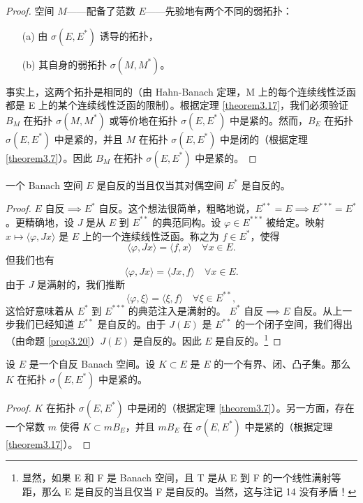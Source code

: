 \begin{proof}
空间 $M$——配备了范数 $E$——先验地有两个不同的弱拓扑：
\begin{itemize}
    \item[(a)] 由 $\sigma(E, E^*)$ 诱导的拓扑，
    \item[(b)] 其自身的弱拓扑 $\sigma(M, M^*)$。
\end{itemize}
事实上，这两个拓扑是相同的（由 Hahn-Banach 定理，M 上的每个连续线性泛函都是 E 上的某个连续线性泛函的限制）。根据定理 \ref{theorem3.17}，我们必须验证 $B_M$ 在拓扑 $\sigma(M, M^*)$ 或等价地在拓扑 $\sigma(E, E^*)$ 中是紧的。然而，$B_E$ 在拓扑 $\sigma(E, E^*)$ 中是紧的，并且 $M$ 在拓扑 $\sigma(E, E^*)$ 中是闭的（根据定理 \ref{theorem3.7}）。因此 $B_M$ 在拓扑 $\sigma(E, E^*)$ 中是紧的。
\end{proof}

\begin{corollary}\label{corollary3.21}
一个 Banach 空间 $E$ 是自反的当且仅当其对偶空间 $E^*$ 是自反的。
\end{corollary}

\begin{proof}
$E \text{ 自反} \implies E^* \text{ 自反}$。这个想法很简单，粗略地说，$E^{**} = E \implies E^{***} = E^*$。更精确地，设 $J$ 是从 $E$ 到 $E^{**}$ 的典范同构。设 $\varphi \in E^{***}$ 被给定。映射 $x \mapsto \langle \varphi, Jx \rangle$ 是 $E$ 上的一个连续线性泛函。称之为 $f \in E^*$，使得
\[ \langle \varphi, Jx \rangle = \langle f, x \rangle \quad \forall x \in E. \]
但我们也有
\[ \langle \varphi, Jx \rangle = \langle Jx, f \rangle \quad \forall x \in E. \]
由于 $J$ 是满射的，我们推断
\[ \langle \varphi, \xi \rangle = \langle \xi, f \rangle \quad \forall \xi \in E^{**}, \]
这恰好意味着从 $E^*$ 到 $E^{***}$ 的典范注入是满射的。
$E^* \text{ 自反} \implies E \text{ 自反}$。从上一步我们已经知道 $E^{**}$ 是自反的。由于 $J(E)$ 是 $E^{**}$ 的一个闭子空间，我们得出（由命题 \ref{prop3.20}）$J(E)$ 是自反的。因此 $E$ 是自反的。\footnote{显然，如果 E 和 F 是 Banach 空间，且 T 是从 E 到 F 的一个线性满射等距，那么 E 是自反的当且仅当 F 是自反的。当然，这与注记 14 没有矛盾！}
\end{proof}

\begin{corollary}\label{corollary3.22}
设 $E$ 是一个自反 Banach 空间。设 $K \subset E$ 是 $E$ 的一个有界、闭、凸子集。那么 $K$ 在拓扑 $\sigma(E, E^*)$ 中是紧的。
\end{corollary}

\begin{proof}
$K$ 在拓扑 $\sigma(E, E^*)$ 中是闭的（根据定理 \ref{theorem3.7}）。另一方面，存在一个常数 $m$ 使得 $K \subset mB_E$，并且 $mB_E$ 在 $\sigma(E, E^*)$ 中是紧的（根据定理 \ref{theorem3.17}）。
\end{proof}

